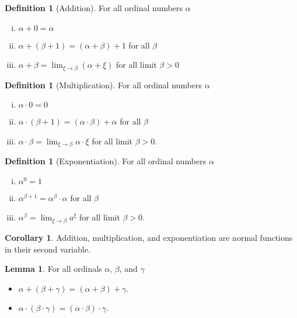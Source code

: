 \documentclass{article}
\theoremstyle{definition}
\newtheorem{crly}[thm]{Corollary}
\newtheorem{defn}[thm]{Definition}
\newtheorem{lmma}[thm]{Lemma}
\begin{document}
\newpage

\begin{defn}[Addition]
    For all ordinal numbers $\alpha$
    \begin{enumerate}[(i)]
        \item $\alpha + 0 = \alpha$
        \item $\alpha + (\beta + 1) = (\alpha + \beta) + 1$ for all $\beta$
        \item $\alpha + \beta = \lim_{\xi \to \beta}(\alpha + \xi)$ for all limit $\beta > 0$
    \end{enumerate}
\end{defn}

\begin{defn}[Multiplication]
    For all ordinal numbers $\alpha$
    \begin{enumerate}[(i)]
        \item $\alpha \cdot 0 = 0$
        \item $\alpha \cdot (\beta + 1) = (\alpha \cdot \beta) + \alpha$ for all $\beta$
        \item $\alpha \cdot \beta = \lim_{\xi \to \beta} \alpha \cdot \xi$ for all limit $\beta > 0$.
    \end{enumerate}
\end{defn}

\begin{defn}[Exponentiation]
    For all ordinal numbers $\alpha$
    \begin{enumerate}[(i)]
        \item $\alpha^0 = 1$
        \item $\alpha^{\beta + 1} = \alpha^\beta \cdot \alpha$ for all $\beta$
        \item $\alpha^\beta = \lim_{\xi \to \beta} a^\xi$ for all limit $\beta > 0$.
    \end{enumerate}
\end{defn}

\begin{crly}
    Addition, multiplication, and exponentiation are normal functions in their second variable.
\end{crly}

\begin{lmma}
    For all ordinals $\alpha$, $\beta$, and $\gamma$
    \begin{itemize}
        \item $\alpha + (\beta + \gamma) = (\alpha + \beta) + \gamma$.
        \item $\alpha \cdot (\beta \cdot \gamma) = (\alpha \cdot \beta) \cdot \gamma$.
    \end{itemize}
\end{lmma}
\end{document}
